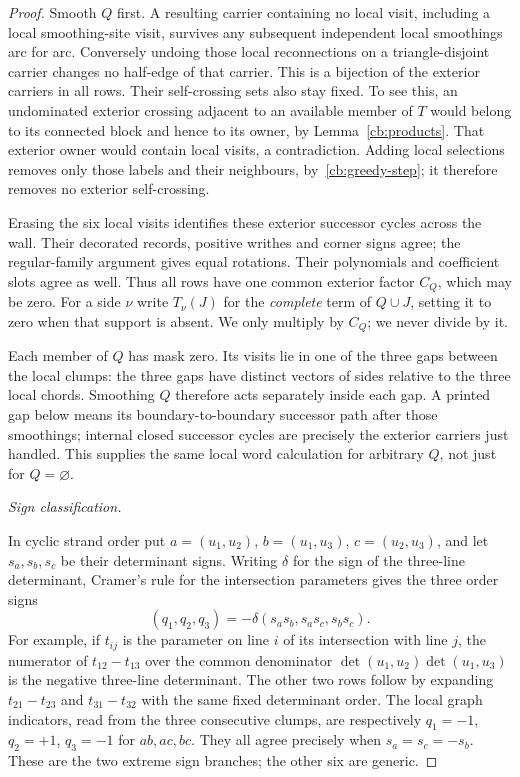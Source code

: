 \begin{proof}
Smooth $Q$ first. A resulting carrier containing no local visit,
including a local smoothing-site visit, survives any subsequent
independent local smoothings arc for arc. Conversely undoing those
local reconnections on a triangle-disjoint carrier changes no half-edge
of that carrier. This is a bijection of the exterior carriers in all
rows. Their self-crossing sets also stay fixed. To see this, an
undominated exterior crossing adjacent to an available member of $T$
would belong to its connected block and hence to its owner, by
Lemma~\ref{cb:products}. That exterior owner would contain local
visits, a contradiction. Adding local selections removes only those
labels and their neighbours, by~\eqref{cb:greedy-step}; it therefore
removes no exterior self-crossing.

Erasing the six local visits identifies these exterior successor cycles
across the wall. Their decorated records, positive writhes and corner
signs agree; the regular-family argument gives equal rotations.
Their polynomials and coefficient slots agree as well. Thus all rows
have one common exterior factor $C_Q$, which may be zero. For a side
$\nu$ write $T_\nu(J)$ for the \emph{complete} term of $Q\cup J$,
setting it to zero when that support is absent. We only multiply by
$C_Q$; we never divide by it.

Each member of $Q$ has mask zero. Its visits lie in one of the three
gaps between the local clumps: the three gaps have distinct vectors
of sides relative to the three local chords. Smoothing $Q$ therefore
acts separately inside each gap. A printed gap below means its
boundary-to-boundary successor path after those smoothings; internal
closed successor cycles are precisely the exterior carriers just
handled. This supplies the same local word calculation for arbitrary
$Q$, not just for $Q=\varnothing$.

\par\medskip\noindent\emph{Sign classification.}\par
In cyclic strand order put $a=(u_1,u_2)$, $b=(u_1,u_3)$,
$c=(u_2,u_3)$, and let $s_a,s_b,s_c$ be their determinant signs.
Writing $\delta$ for the sign of the three-line determinant, Cramer's
rule for the intersection parameters gives the three order signs
\begin{equation}\label{rtr:line-orders}
 (q_1,q_2,q_3)=-\delta(s_as_b,s_as_c,s_bs_c).
\end{equation}
For example, if $t_{ij}$ is the parameter on line $i$ of its
intersection with line $j$, the numerator of
$t_{12}-t_{13}$ over the common denominator
$\det(u_1,u_2)\det(u_1,u_3)$ is the negative three-line determinant.
The other two rows follow by expanding $t_{21}-t_{23}$ and
$t_{31}-t_{32}$ with the same fixed determinant order.
The local graph indicators, read from the three consecutive clumps,
are respectively $q_1=-1$, $q_2=+1$, $q_3=-1$ for $ab,ac,bc$.
They all agree precisely when $s_a=s_c=-s_b$. These are the two
extreme sign branches; the other six are generic.


\end{proof}
